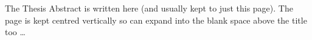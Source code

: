 The Thesis Abstract is written here (and usually kept to just this page). The page is kept centred vertically so can expand into the blank space above the title too \ldots
